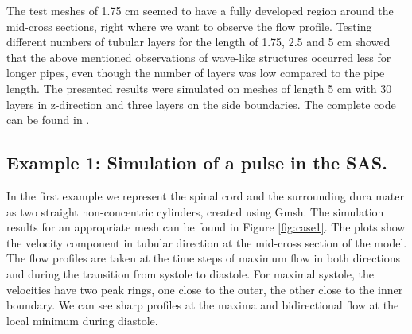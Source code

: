 %


The test meshes of 1.75 cm seemed to have a fully developed region around
the mid-cross sections, right where we want to observe the flow profile. Testing different numbers of tubular layers for the length of 1.75, 2.5 and 5 cm showed that the above mentioned observations of wave-like structures occurred less for longer pipes, even though the number of layers was low compared to the pipe length.
The presented results were simulated on meshes of length 5 cm with 30 layers in z-direction and three layers on the side boundaries. The complete code can be found in .





\subsection{Example 1: Simulation of a pulse in the SAS.}
In the first example we represent the spinal cord and the surrounding dura mater as two straight non-concentric cylinders, created using Gmsh. 
The simulation results for an appropriate mesh can be found in Figure
\ref{fig:case1}. The plots show the velocity component in tubular direction
at the mid-cross section of the model. The flow profiles are taken at the time steps of maximum flow in both directions and during the transition from systole to diastole. For maximal systole, the velocities have two peak rings, one close to the outer, the other close to the inner boundary. We can see sharp profiles at the maxima and bidirectional flow at the local minimum during diastole.


